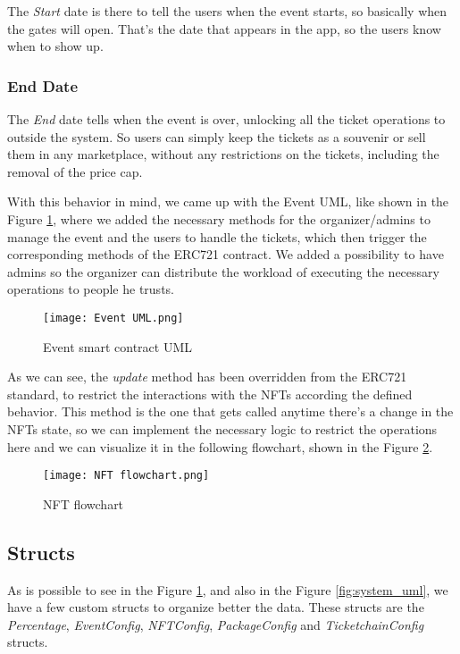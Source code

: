 The \textit{Start} date is there to tell the users when the event starts, so
basically when the gates will open. That's the date that appears in the app, so
the users know when to show up.

\subsubsection{End Date}

The \textit{End} date tells when the event is over, unlocking all the ticket
operations to outside the system. So users can simply keep the tickets as a
souvenir or sell them in any marketplace, without any restrictions on the
tickets, including the removal of the price cap.

With this behavior in mind, we came up with the Event UML, like shown in the
Figure \ref{fig:event_uml}, where we added the necessary methods for the
organizer/admins to manage the event and the users to handle the tickets, which
then trigger the corresponding methods of the ERC721 contract. We added a
possibility to have admins so the organizer can distribute the workload of
executing the necessary operations to people he trusts.

\begin{figure}[H]
	\texttt{[image: Event UML.png]}
	\centering
	\caption{Event smart contract UML}
	\label{fig:event_uml}
\end{figure}

As we can see, the \textit{update} method has been overridden from the ERC721
standard, to restrict the interactions with the NFTs according the defined
behavior. This method is the one that gets called anytime there's a change in
the NFTs state, so we can implement the necessary logic to restrict the
operations here and we can visualize it in the following flowchart, shown in
the Figure \ref{fig:nft_flowchart}.

\begin{figure}[H]
	\texttt{[image: NFT flowchart.png]}
	\centering
	\caption{NFT flowchart}
	\label{fig:nft_flowchart}
\end{figure}

\subsection{Structs}
\label{subsec:structs}

As is possible to see in the Figure \ref{fig:event_uml}, and also in the Figure
\ref{fig:system_uml}, we have a few custom structs to organize better the data.
These structs are the \textit{Percentage}, \textit{EventConfig},
\textit{NFTConfig}, \textit{PackageConfig} and \textit{TicketchainConfig}
structs.

